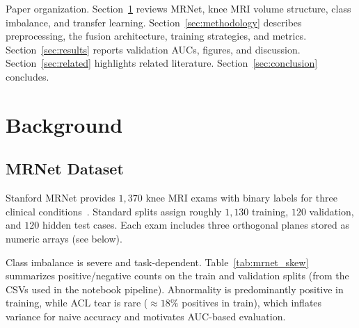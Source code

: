 \documentclass[10pt,twocolumn]{article}
\begin{document}
Paper organization.
Section~\ref{sec:background} reviews MRNet, knee MRI volume structure, class imbalance, and transfer learning.
Section~\ref{sec:methodology} describes preprocessing, the fusion architecture, training strategies, and metrics.
Section~\ref{sec:results} reports validation AUCs, figures, and discussion.
Section~\ref{sec:related} highlights related literature.
Section~\ref{sec:conclusion} concludes.

\section{Background}
\label{sec:background}

\subsection{MRNet Dataset}

Stanford MRNet provides $1{,}370$ knee MRI exams with binary labels for three clinical conditions~\cite{bien2018plos,bien2020deep, stanford_mrnet}. Standard splits assign roughly $1{,}130$ training, $120$ validation, and $120$ hidden test cases. Each exam includes three orthogonal planes stored as numeric arrays (see below).

Class imbalance is severe and task-dependent. Table~\ref{tab:mrnet_skew} summarizes positive/negative counts on the train and validation splits (from the CSVs used in the notebook pipeline). Abnormality is predominantly positive in training, while ACL tear is rare ($\approx 18\%$ positives in train), which inflates variance for naive accuracy and motivates AUC-based evaluation.

\begin{table}[H]
\centering
\caption{MRNet label skew by task (train / valid splits, counts of positive and negative cases).}
\label{tab:mrnet_skew}
\scriptsize
\setlength{\tabcolsep}{3pt}
\end{table}
\end{document}
